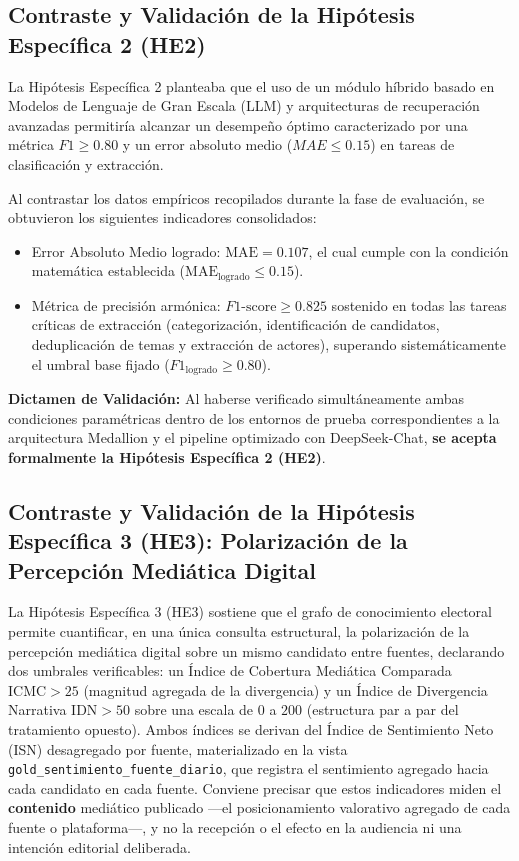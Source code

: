 \subsection*{Contraste y Validación de la Hipótesis Específica 2 (HE2)}
La Hipótesis Específica 2 planteaba que el uso de un módulo híbrido basado en Modelos de Lenguaje de Gran Escala (LLM) y arquitecturas de recuperación avanzadas permitiría alcanzar un desempeño óptimo caracterizado por una métrica $F1 \ge 0.80$ y un error absoluto medio ($MAE \le 0.15$) en tareas de clasificación y extracción.

Al contrastar los datos empíricos recopilados durante la fase de evaluación, se obtuvieron los siguientes indicadores consolidados:
\begin{itemize}
    \item Error Absoluto Medio logrado: $\text{MAE} = 0.107$, el cual cumple con la condición matemática establecida ($\text{MAE}_{\text{logrado}} \le 0.15$).
    \item Métrica de precisión armónica: $F1\text{-score} \ge 0.825$ sostenido en todas las tareas críticas de extracción (categorización, identificación de candidatos, deduplicación de temas y extracción de actores), superando sistemáticamente el umbral base fijado ($F1_{\text{logrado}} \ge 0.80$).
\end{itemize}

\noindent \textbf{Dictamen de Validación:} Al haberse verificado simultáneamente ambas condiciones paramétricas dentro de los entornos de prueba correspondientes a la arquitectura Medallion y el pipeline optimizado con DeepSeek-Chat, \textbf{se acepta formalmente la Hipótesis Específica 2 (HE2)}.

\subsection*{Contraste y Validación de la Hipótesis Específica 3 (HE3): Polarización de la Percepción Mediática Digital}
La Hipótesis Específica 3 (HE3) sostiene que el grafo de conocimiento electoral permite cuantificar, en una única consulta estructural, la polarización de la percepción mediática digital sobre un mismo candidato entre fuentes, declarando dos umbrales verificables: un Índice de Cobertura Mediática Comparada $\text{ICMC} > 25$ (magnitud agregada de la divergencia) y un Índice de Divergencia Narrativa $\text{IDN} > 50$ sobre una escala de $0$ a $200$ (estructura par a par del tratamiento opuesto). Ambos índices se derivan del Índice de Sentimiento Neto (ISN) desagregado por fuente, materializado en la vista \texttt{gold\_sentimiento\_fuente\_diario}, que registra el sentimiento agregado hacia cada candidato en cada fuente. Conviene precisar que estos indicadores miden el \textbf{contenido} mediático publicado —el posicionamiento valorativo agregado de cada fuente o plataforma—, y no la recepción o el efecto en la audiencia ni una intención editorial deliberada.

